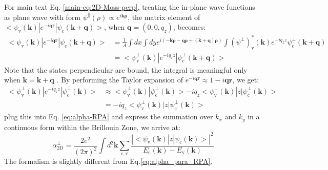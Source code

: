 \documentclass[manuscript=suppinfo,email=true,hyperref=true,keywords=false]{achemso}
\begin{document}
For main text Eq. \ref{main-eq:2D-Moss-perp}, treating the in-plane
wave functions as plane wave with form
$\psi^{\parallel}(\rho) \propto e^{i \mathbf{k \rho}}$, the matrix
element of
$<\psi_{\mathrm{v}}(\mathbf{k})|e^{-i\mathbf{qr}}|\psi_{\mathrm{c}}(\mathbf{k+q})>$,
when $\mathbf{q}=(0, 0, q_{z})$, becomes\cite{Hybertsen_1987}:
\begin{equation}
  \begin{aligned}
    \label{eq:matrix-z}
  <\psi_{\mathrm{v}}(\mathbf{k})|e^{-i\mathbf{qr}}|\psi_{\mathrm{c}}(\mathbf{k+q})>
  &= \frac{1}{A} \int dx \int dy
  e^{i(\mathbf{-k \rho} - \mathbf{q \rho} + \mathbf{(k+q) \rho})}
  \int (\psi^{\perp})^{*}_{\mathrm{v}}(\mathbf{k})e^{-iq_{z}z}\psi^{\perp}_{\mathrm{c}}(\mathbf{k+q})\\
  &= <\psi^{\perp}_{\mathrm{v}}(\mathbf{k})|e^{-iq_{z}z}|\psi^{\perp}_{\mathrm{c}}(\mathbf{k+q})>
  \end{aligned}
\end{equation}
Note that the states perpendicular are bound, the integral is
meaningful only when $\mathbf{k=k+q}$ \cite{davies_physics_1997}. By
performing the Taylor expansion of
$e^{-i\mathbf{qr}} \approx 1 - i\mathbf{qr}$, we get:
\begin{equation}
  \begin{aligned}
    \label{eq:matrix-z-2}
    <\psi^{\perp}_{\mathrm{v}}(\mathbf{k})|e^{-iq_{z}z}|\psi^{\perp}_{\mathrm{c}}(\mathbf{k})>
    &\approx <\psi^{\perp}_{\mathrm{v}}(\mathbf{k})|\psi^{\perp}_{\mathrm{c}}(\mathbf{k})> -
    iq_{z} <\psi^{\perp}_{\mathrm{v}}(\mathbf{k})|z|\psi^{\perp}_{\mathrm{c}}(\mathbf{k})>\\
    &= -iq_{z} <\psi^{\perp}_{\mathrm{v}}(\mathbf{k})|z|\psi^{\perp}_{\mathrm{c}}(\mathbf{k})>
   \end{aligned}
\end{equation}
plug this into Eq. \ref{eq:alpha-RPA} and express the summation over
$k_{x}$ and $k_{y}$ in a continuous form within the Brillouin Zone, we
arrive at:
\begin{equation}
\label{eq:alpha_perp_RPA}
\alpha_{\mathrm{2D}}^{\perp} = \frac{2e^{2}}{(2 \pi) ^{2}} \int d^{2}\mathbf{k}
\sum_{\mathrm{c, v}}
\frac{|<\psi_{\mathrm{v}}(\mathbf{k})|z|\psi_{\mathrm{c}}(\mathbf{k})>|^{2}}
{E_{\mathrm{c}}(\mathbf{k}) - E_{\mathrm{v}}(\mathbf{k})}
\end{equation}
The formalism is slightly different from Eq.\ref{eq:alpha_para_RPA}.
\end{document}
